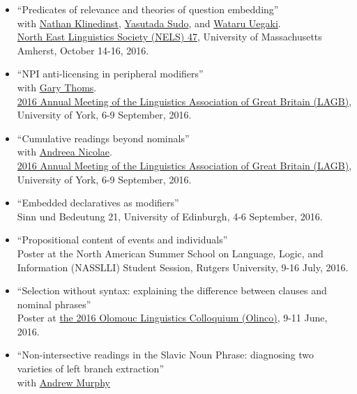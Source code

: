 \documentclass[]{article}
\providecommand{\tightlist}{%
  \setlength{\itemsep}{0pt}\setlength{\parskip}{0pt}}
\begin{document}
\begin{itemize}
  \begin{itemize}
  \tightlist
  \item
    ``Predicates of relevance and theories of question embedding''\\
    with
    \href{https://www.ucl.ac.uk/pals/people/profiles/academic-staff/nathan-klinedinst}{Nathan
    Klinedinst}, \href{http://www.ucl.ac.uk/~ucjtudo/}{Yasutada Sudo},
    and \href{https://wataruu.wordpress.com}{Wataru Uegaki}.\\
    \href{http://umass2016.nelsconference.org/}{North East Linguistics
    Society (NELS) 47}, University of Massachusetts Amherst, October
    14-16, 2016.
  \item
    ``NPI anti-licensing in peripheral modifiers''\\
    with \href{https://sites.google.com/site/garythoms/}{Gary Thoms}.\\
    \href{http://www.lagb.org.uk/lagb2016/home}{2016 Annual Meeting of
    the Linguistics Association of Great Britain (LAGB)}, University of
    York, 6-9 September, 2016.
  \item
    ``Cumulative readings beyond nominals''\\
    with \href{https://sites.google.com/site/andreeanicolae/}{Andreea
    Nicolae}.\\
    \href{http://www.lagb.org.uk/lagb2016/home}{2016 Annual Meeting of
    the Linguistics Association of Great Britain (LAGB)}, University of
    York, 6-9 September, 2016.
  \item
    ``Embedded declaratives as modifiers''\\
    Sinn und Bedeutung 21, University of Edinburgh, 4-6 September, 2016.
  \item
    ``Propositional content of events and individuals''\\
    Poster at the North American Summer School on Language, Logic, and
    Information (NASSLLI) Student Session, Rutgers University, 9-16
    July, 2016.
  \item
    ``Selection without syntax: explaining the difference between
    clauses and nominal phrases''\\
    Poster at \href{http://olinco.upol.cz/}{the 2016 Olomouc Linguistics
    Colloquium (Olinco)}, 9-11 June, 2016.
  \item
    ``Non-intersective readings in the Slavic Noun Phrase: diagnosing
    two varieties of left branch extraction''\\
    with \href{http://home.uni-leipzig.de/murphy/}{Andrew Murphy}\\

\end{itemize}
\end{itemize}
\end{document}
